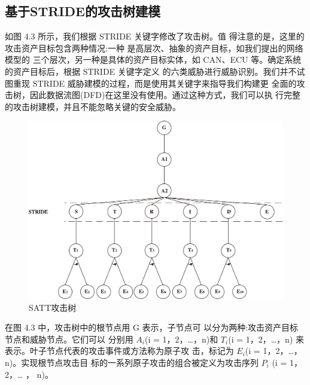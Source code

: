 \subsection{基于STRIDE的攻击树建模}
如图 4.3 所示，我们根据 STRIDE 关键字修改了攻击树。值
得注意的是，这里的攻击资产目标包含两种情况:一种
是高层次、抽象的资产目标，如我们提出的网络模型的
三个层次，另一种是具体的资产目标实体，如 CAN、ECU
等。确定系统的资产目标后，根据 STRIDE 关键字定义
的六类威胁进行威胁识别。我们并不试图重现 STRIDE
威胁建模的过程，而是使用其关键字来指导我们构建更
全面的攻击树，因此数据流图(DFD)在这里没有使用。通过这种方式，我们可以执
行完整的攻击树建模，并且不能忽略关键的安全威胁。
\begin{figure}
    \centering
    \includegraphics[scale=0.5]{resources/img/a14.jpg}
    \caption{SATT攻击树}
  \end{figure}
\newline
在图 4.3 中，攻击树中的根节点用 G 表示，子节点可
以分为两种:攻击资产目标节点和威胁节点。它们可以
分别用 $A_i$(i = 1，2，…，n)和 $T_i$(i = 1，2，…，n)
来表示。叶子节点代表的攻击事件或方法称为原子攻
击，标记为 $E_i$(i = 1，2，…，n)。实现根节点攻击目
标的一系列原子攻击的组合被定义为攻击序列 $P_i$ (i =
1，2，… ， n)。

